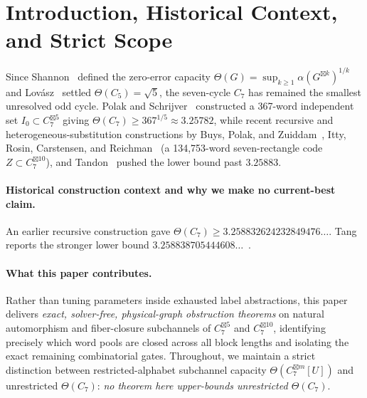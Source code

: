 \documentclass[11pt,letterpaper]{article}
\theoremstyle{definition}
\theoremstyle{remark}
\newcommand{\ThetaCap}{\Theta}
\begin{document}
\section{Introduction, Historical Context, and Strict Scope}
Since Shannon~\cite{Shannon1956} defined the zero-error capacity $\ThetaCap(G) = \sup_{k \ge 1} \alpha(G^{\boxtimes k})^{1/k}$ and Lov\'asz~\cite{Lovasz1979} settled $\ThetaCap(C_5)=\sqrt{5}$, the seven-cycle $C_7$ has remained the smallest unresolved odd cycle. Polak and Schrijver~\cite{PolakSchrijver2019} constructed a 367-word independent set $I_0 \subset C_7^{\boxtimes 5}$ giving $\ThetaCap(C_7) \ge 367^{1/5} \approx 3.25782$, while recent recursive and heterogeneous-substitution constructions by Buys, Polak, and Zuiddam~\cite{BPZ2026}, Itty, Rosin, Carstensen, and Reichman~\cite{IRCR2026} (a 134,753-word seven-rectangle code $Z \subset C_7^{\boxtimes 10}$), and Tandon~\cite{Tandon2026} pushed the lower bound past $3.25883$.

\paragraph{Historical construction context and why we make no current-best claim.}
An earlier recursive construction gave $\ThetaCap(C_7) \ge 3.258832624232849476\dots$. Tang reports the stronger lower bound $3.258838705444608\dots$~\cite{TaoConstants9a}.

\paragraph{What this paper contributes.}
Rather than tuning parameters inside exhausted label abstractions, this paper delivers \emph{exact, solver-free, physical-graph obstruction theorems} on natural automorphism and fiber-closure subchannels of $C_7^{\boxtimes 5}$ and $C_7^{\boxtimes 10}$, identifying precisely which word pools are closed across all block lengths and isolating the exact remaining combinatorial gates. Throughout, we maintain a strict distinction between restricted-alphabet subchannel capacity $\ThetaCap(C_7^{\boxtimes m}[U])$ and unrestricted $\ThetaCap(C_7)$: \emph{no theorem here upper-bounds unrestricted $\ThetaCap(C_7)$}.
\end{document}
